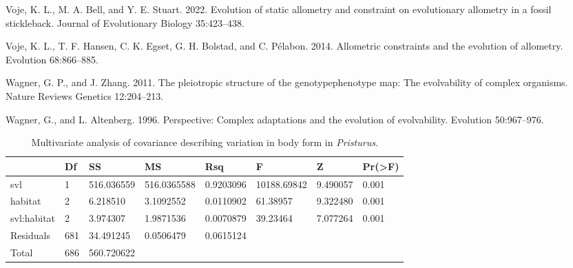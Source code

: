 \documentclass[
  11pt,
]{article}
\newlength{\cslhangindent}
\newlength{\cslentryspacingunit} %
\newenvironment{CSLReferences}[2] %
 {%
  \setlength{\parindent}{0pt}
  \ifodd #1
  \let\oldpar\par
  \def\par{\hangindent=\cslhangindent\oldpar}
  \fi
  \setlength{\parskip}{#2\cslentryspacingunit}
 }%
 {}
\begin{document}
\begin{CSLReferences}{1}{0}
\leavevmode{}%
Voje, K. L., M. A. Bell, and Y. E. Stuart. 2022. Evolution of static
allometry and constraint on evolutionary allometry in a fossil
stickleback. Journal of Evolutionary Biology 35:423--438.

\leavevmode{}%
Voje, K. L., T. F. Hansen, C. K. Egset, G. H. Bolstad, and C. Pélabon.
2014. Allometric constraints and the evolution of allometry. Evolution
68:866--885.

\leavevmode{}%
Wagner, G. P., and J. Zhang. 2011. The pleiotropic structure of the
genotype{\textendash}phenotype map: The evolvability of complex
organisms. Nature Reviews Genetics 12:204--213.

\leavevmode{}%
Wagner, G., and L. Altenberg. 1996. Perspective: Complex adaptations and
the evolution of evolvability. Evolution 50:967--976.

\end{CSLReferences}

\newpage

\begin{table}[H]

\caption{\label{tab:unnamed-chunk-1}Multivariate analysis of covariance describing variation in body form in \textit{Pristurus}.}
\centering
\begin{tabular}[t]{llllllll}
\toprule
  & Df & SS & MS & Rsq & F & Z & Pr(>F)\\
\midrule
svl & 1 & 516.036559 & 516.0365588 & 0.9203096 & 10188.69842 & 9.490057 & 0.001\\
habitat & 2 & 6.218510 & 3.1092552 & 0.0110902 & 61.38957 & 9.322480 & 0.001\\
svl:habitat & 2 & 3.974307 & 1.9871536 & 0.0070879 & 39.23464 & 7.077264 & 0.001\\
Residuals & 681 & 34.491245 & 0.0506479 & 0.0615124 &  &  & \\
Total & 686 & 560.720622 &  &  &  &  & \\
\bottomrule
\end{tabular}
\end{table}

\newpage
\end{document}
